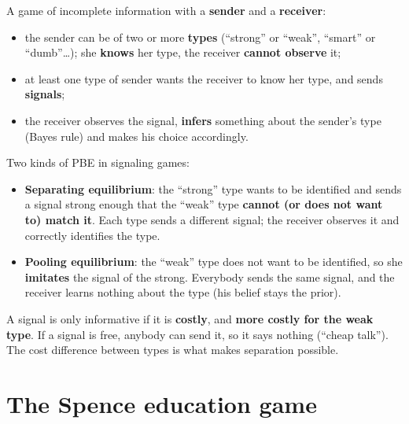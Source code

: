 \documentclass[11pt,a4paper,openany]{book}
\begin{document}
\begin{defnbox}[title=Signaling game]
A game of incomplete information with a \textbf{sender} and a \textbf{receiver}:
\begin{itemize}
  \item the sender can be of two or more \textbf{types} (``strong'' or ``weak'', ``smart''
        or ``dumb''\dots); she \textbf{knows} her type, the receiver \textbf{cannot observe}
        it;
  \item at least one type of sender wants the receiver to know her type, and sends
        \textbf{signals};
  \item the receiver observes the signal, \textbf{infers} something about the sender's type
        (Bayes rule) and makes his choice accordingly.
\end{itemize}
\end{defnbox}

\begin{defnbox}[title=Separating and pooling equilibria]
Two kinds of PBE in signaling games:
\begin{itemize}
  \item \textbf{Separating equilibrium}: the ``strong'' type wants to be identified and
        sends a signal strong enough that the ``weak'' type \textbf{cannot (or does not want
        to) match it}. Each type sends a different signal; the receiver observes it and
        correctly identifies the type.
  \item \textbf{Pooling equilibrium}: the ``weak'' type does not want to be identified, so
        she \textbf{imitates} the signal of the strong. Everybody sends the same signal, and
        the receiver learns nothing about the type (his belief stays the prior).
\end{itemize}
\end{defnbox}

\begin{rembox}[title=In plain words]
A signal is only informative if it is \textbf{costly}, and \textbf{more costly for the weak
type}. If a signal is free, anybody can send it, so it says nothing (``cheap talk''). The
cost difference between types is what makes separation possible.
\end{rembox}


\section{The Spence education game}
\end{document}
